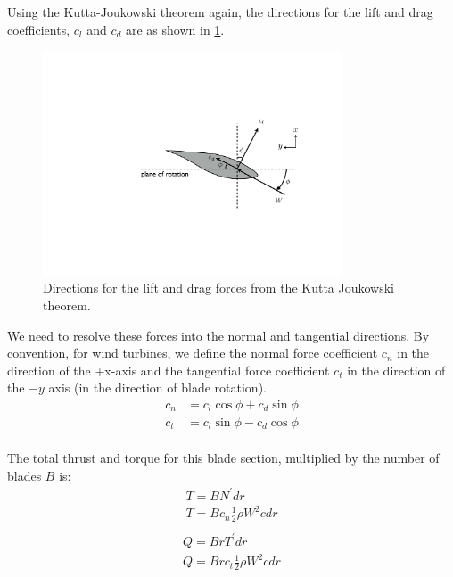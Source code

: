 \documentclass{article}
\begin{document}
Using the Kutta-Joukowski theorem again, the directions for the lift and drag coefficients, $c_l$ and $c_d$ are as shown in \cref{fig:inflow3}.
\begin{figure}[htbp]
\centering
\includegraphics[width=3.5in]{figures/inflow3}
\caption{Directions for the lift and drag forces from the Kutta Joukowski theorem.}
\label{fig:inflow3}
\end{figure}
We need to resolve these forces into the normal and tangential directions.  By convention, for wind turbines, we define the normal force coefficient $c_n$ in the direction of the +x-axis and the tangential force coefficient $c_t$ in the direction of the $-y$ axis (in the direction of blade rotation).
\begin{equation}
    \begin{aligned}
        c_n &= c_l \cos\phi + c_d \sin\phi\\
        c_t &= c_l \sin\phi - c_d \cos\phi\\
    \end{aligned}
\end{equation}

The total thrust and torque for this blade section, multiplied by the number of blades $B$ is:
\begin{equation}
    \begin{aligned}
        T = B N^\prime dr\\
        T = B c_n \frac{1}{2}\rho W^2 c dr\\
    \end{aligned}
    \label{eq:beT}
\end{equation}
\begin{equation}
    \begin{aligned}
        Q = B r T^\prime dr\\
        Q = B r c_t \frac{1}{2}\rho W^2 c dr\\
    \end{aligned}
    \label{eq:beQ}
\end{equation}
\end{document}
